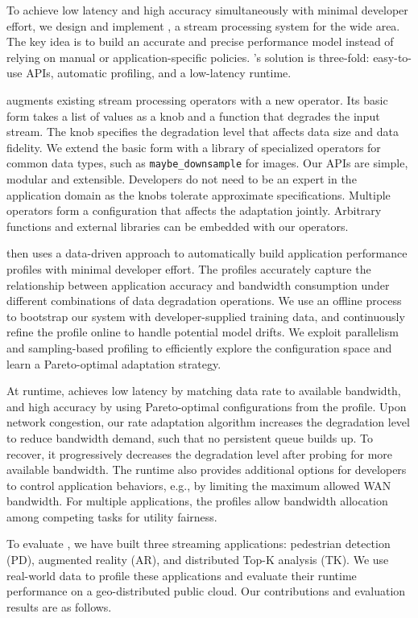 To achieve low latency and high accuracy simultaneously with minimal developer
effort, we design and implement \sysname{}, a stream processing system for the wide area. The key idea is to build an accurate and precise performance model instead of relying on manual or application-specific policies. \sysname{}'s
solution is three-fold: easy-to-use APIs, automatic profiling, and a
low-latency runtime.

\sysname{} augments existing stream processing operators with a new \maybe{}
operator. Its basic form takes a list of values as a knob and a function that
degrades the input stream. The knob specifies the degradation level that affects
data size and data fidelity. We extend the basic form with a library of
specialized operators for common data types, such as \texttt{maybe\_downsample}
for images. Our APIs are simple, modular and extensible. Developers do not need
to be an expert in the application domain as the knobs tolerate approximate
specifications. Multiple operators form a configuration that affects the
adaptation jointly. Arbitrary functions and external libraries can be embedded
with our operators.

\sysname{} then uses a data-driven approach to automatically build application
performance profiles with minimal developer effort. The profiles accurately
capture the relationship between application accuracy and bandwidth consumption
under different combinations of data degradation operations. We use an offline
process to bootstrap our system with developer-supplied training data, and
continuously refine the profile online to handle potential model drifts. We
exploit parallelism and sampling-based profiling to efficiently explore the
configuration space and learn a Pareto-optimal adaptation strategy.

At runtime, \sysname{} achieves low latency by matching data rate to available
bandwidth, and high accuracy by using Pareto-optimal configurations from the
profile. Upon network congestion, our rate adaptation algorithm increases the
degradation level to reduce bandwidth demand, such that no persistent queue
builds up. To recover, it progressively decreases the degradation level after
probing for more available bandwidth. The runtime also provides additional
options for developers to control application behaviors, e.g., by limiting the
maximum allowed WAN bandwidth. For multiple applications, the
profiles allow bandwidth allocation among competing tasks for utility fairness.

To evaluate \sysname{}, we have built three streaming applications: pedestrian
detection (PD), augmented reality (AR), and distributed Top-K analysis (TK). We use
real-world data to profile these applications and evaluate their runtime
performance on a geo-distributed public cloud. Our contributions and
evaluation results are as follows.

